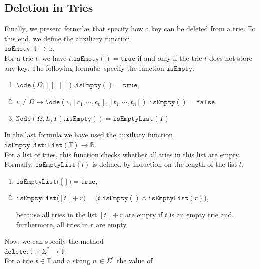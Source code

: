 \subsection{Deletion in Tries}
Finally, we present formul\ae\ that specify how a key can be deleted from a trie.
To this end, we define the auxiliary function
\\[0.2cm]
\hspace*{1.3cm} 
$\mathtt{isEmpty}: \mathbb{T} \rightarrow \mathbb{B}$.
\\[0.2cm]
For a trie $t$, we have $t.\mathtt{isEmpty}() = \mathtt{true}$ if and only if the trie $t$ does not
store any key.  The following formul\ae\ specify the function $\mathtt{isEmpty}$:
\begin{enumerate}
\item $\mathtt{Node}(\Omega, [],[]).\mathtt{isEmpty}() = \mathtt{true}$,
\item $v \not= \Omega \rightarrow 
       \mathtt{Node}(v, [c_1,\cdots,c_n],[t_1,\cdots,t_n]).\mathtt{isEmpty}() = \mathtt{false}$,
\item $\mathtt{Node}(\Omega, L, T).\mathtt{isEmpty}() = \mathtt{isEmptyList}(T)$
\end{enumerate}
In the last formula we have used the auxiliary function
\\[0.2cm]
\hspace*{1.3cm}
$\mathtt{isEmptyList}: \mathtt{List}(\mathbb{T}) \rightarrow \mathbb{B}$.
\\[0.2cm]
For a list of tries, this function checks whether all tries in this list are empty.  Formally,
$\mathtt{isEmptyList}(l)$ is defined by induction on the length of the list $l$.
\begin{enumerate}
\item $\mathtt{isEmptyList}\bigl([]\bigr) = \mathtt{true}$,
\item $\mathtt{isEmptyList}\bigl([t] + r\bigr) = \bigl(t.\mathtt{isEmpty}() \wedge \mathtt{isEmptyList}(r)\bigr)$,

      because all  tries in the list $[t]+r$ are empty if  $t$ is an empty trie
      and, furthermore, all tries in  $r$ are empty.
\end{enumerate}
Now, we can specify the method
\\[0.2cm]
\hspace*{1.3cm}
$\mathtt{delete}: \mathbb{T} \times \Sigma^* \rightarrow \mathbb{T}$.
\\[0.2cm]
For a trie  $t \in \mathbb{T}$ and a string $w \in \Sigma^*$ the value of
 \\[0.2cm]
